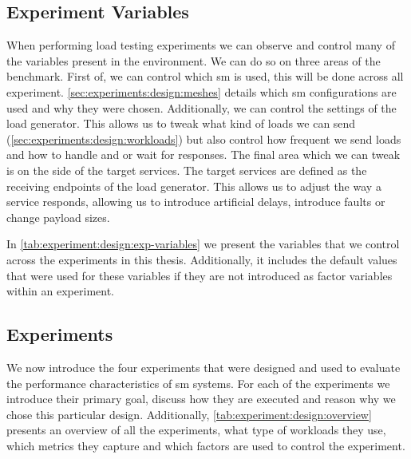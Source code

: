 \subsection{Experiment Variables}
\label{sec:experiments:design:variables}

When performing load testing experiments we can observe and control many of the variables present in the environment. We can do so on three areas of the benchmark. First of, we can control which \gls{sm} is used, this will be done across all experiment. \cref{sec:experiments:design:meshes} details which \gls{sm} configurations are used and why they were chosen. Additionally, we can control the settings of the load generator. This allows us to tweak what kind of loads we can send (\cref{sec:experiments:design:workloads}) but also control how frequent we send loads and how to handle and or wait for responses. The final area which we can tweak is on the side of the target services. The target services are defined as the receiving endpoints of the load generator. This allows us to adjust the way a service responds, allowing us to introduce artificial delays, introduce faults or change payload sizes.



In \cref{tab:experiment:design:exp-variables} we present the variables that we control across the experiments in this thesis. Additionally, it includes the default values that were used for these variables if they are not introduced as factor variables within an experiment.

\subsection{Experiments}
\label{sec:experiments:design:overview}

We now introduce the four experiments that were designed and used to evaluate the performance characteristics of \gls{sm} systems. For each of the experiments we introduce their primary goal, discuss how they are executed and reason why we chose this particular design. Additionally, \cref{tab:experiment:design:overview} presents an overview of all the experiments, what type of workloads they use, which  metrics they capture and which factors  are used to control the experiment.



